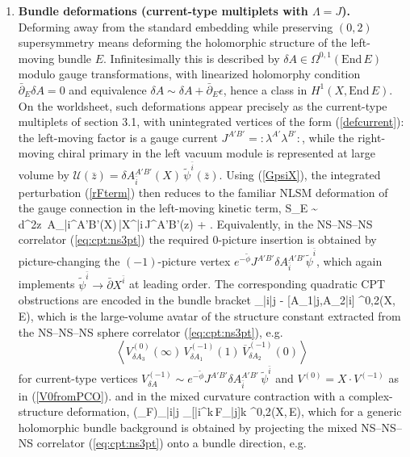 \documentclass[12pt]{article}
\newcommand{\wt}[1]{\widetilde{#1}}
\newcommand{\mc}[1]{\mathcal{#1}}
\newcommand{\bz}{\bar{z}}
\begin{document}
\begin{enumerate}
	\item {\bf Bundle deformations (current-type multiplets with $\Lambda=J$).}\\
	Deforming away from the standard embedding while preserving $(0,2)$ supersymmetry means deforming the holomorphic structure of the left-moving bundle $E$. Infinitesimally this is described by $\delta A\in\Omega^{0,1}(\mathrm{End}\,E)$ modulo gauge transformations, with linearized holomorphy condition $\bar\partial_E \delta A=0$ and equivalence $\delta A\sim \delta A+\bar\partial_E\epsilon$, hence a class in $H^{1}(X,\mathrm{End}\,E)$. On the worldsheet, such deformations appear precisely as the current-type multiplets of section 3.1, with unintegrated vertices of the form (\ref{defcurrent}): the left-moving factor is a gauge current $J^{A'B'}=: \lambda^{A'}\lambda^{B'}:$, while the right-moving chiral primary in the left vacuum module is represented at large volume by $\mc{U}(\bz)=\delta A_{\bar i}^{A'B'}(X)\,\wt\psi^{\bar i}(\bz)$. Using (\ref{GpsiX}), the integrated perturbation (\ref{rFterm}) then reduces to the familiar NLSM deformation of the gauge connection in the left-moving kinetic term,
	\ie
	\delta S_E \;\sim\; \int d^2z~\delta A_{\bar i}^{A'B'}(X)\,\bar\partial X^{\bar i}\,J^{A'B'}(z) + \cdots.
		\fe
		Equivalently, in the NS--NS--NS correlator (\ref{eq:cpt:ns3pt}) the required 0-picture insertion is obtained by picture-changing the $(-1)$-picture vertex $e^{-{\wt\phi}}J^{A'B'}\delta A_{\bar i}^{A'B'}\wt\psi^{\bar i}$, which again implements $\wt\psi^{\bar i}\to \bar\partial X^{\bar i}$ at leading order. The corresponding quadratic CPT obstructions are encoded in the bundle bracket
		\ie
		_{\bar i\bar j}
	\;\equiv{}-
	[\delta A_{1\bar j},\delta A_{2\bar i}]
		\;\in\;\Omega^{0,2}(X,\,E),
		\fe
		which is the large-volume avatar of the structure constant extracted from the NS--NS--NS sphere correlator (\ref{eq:cpt:ns3pt}), e.g.
		\[
		\left\langle V_{\delta A_3}^{(0)}(\infty)\,V_{\delta A_1}^{(-1)}(1)\,\overline V_{\delta A_2}^{(-1)}(0)\right\rangle
		\]
		for current-type vertices $V_{\delta A}^{(-1)}\sim e^{-{\wt\phi}}J^{A'B'}\delta A_{\bar i}^{A'B'}\,\wt\psi^{\bar i}$ and $V^{(0)}=X\cdot V^{(-1)}$ as in (\ref{V0fromPCO}).
		and in the mixed curvature contraction with a complex-structure deformation,
		\ie
		(\iota_{\mu}{\cal F})_{\bar i\bar j}
	\;\equiv\;
	\mu_{[\bar i}{}^{k}\,{\cal F}_{\bar j]k}
		\;\in\;\Omega^{0,2}(X,\,E),
			\fe
			which for a generic holomorphic bundle background is obtained by projecting the mixed NS--NS--NS correlator (\ref{eq:cpt:ns3pt}) onto a bundle direction, e.g.

\end{enumerate}
\end{document}
